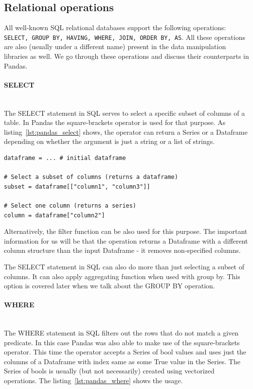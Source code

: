 \subsection{Relational operations}

All well-known SQL relational databases support the following operations:
\texttt{SELECT, GROUP BY, HAVING, WHERE, JOIN, ORDER BY, AS}.
All these operations are also (usually under a different name) present in the data manipulation libraries as well.
We go through these operations and discuss their counterparts in Pandas.

\paragraph{SELECT} \leavevmode \\

The SELECT statement in SQL serves to select a specific subset of columns of a table.
In Pandas the square-brackets operator is used for that purpose.
As listing~\ref{lst:pandas_select} shows, the operator can return a Series or a Dataframe depending on whether
the argument is just a string or a list of strings.

\begin{lstlisting}[caption=Select in Pandas, label={lst:pandas_select}, captionpos=b]
dataframe = ... # initial dataframe

# Select a subset of columns (returns a dataframe)
subset = dataframe[["column1", "column3"]]

# Select one column (returns a series)
column = dataframe["column2"]
\end{lstlisting}

Alternatively, the filter function can be also used for this purpose.
The important information for us will be that the operation returns a Dataframe with a different column structure
than the input Dataframe - it removes non-specified columns.

The SELECT statement in SQL can also do more than just selecting a subset of columns.
It can also apply aggregating function when used with group by.
This option is covered later when we talk about the GROUP BY operation.

\paragraph{WHERE} \leavevmode \\

The WHERE statement in SQL filters out the rows that do not match a given predicate.
In this case Pandas was also able to make use of the square-brackets operator.
This time the operator accepts a Series of bool values and uses just the columns of a Dataframe with index same as
some True value in the Series.
The Series of bools is usually (but not necessarily) created using vectorized operations.
The listing~\ref{lst:pandas_where} shows the usage.

